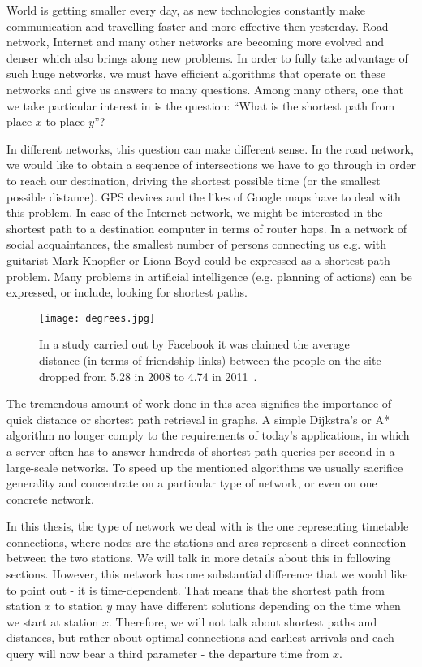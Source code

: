 \noindent World is getting smaller every day, as new technologies constantly make communication and travelling faster and more effective then yesterday. Road network, Internet and many other networks are becoming more evolved and denser which also brings along new problems. In order to fully take advantage of such huge networks, we must have efficient algorithms that operate on these networks and give us answers to many questions. Among many others, one that we take particular interest in is the question: ``What is the shortest path from place $x$ to place $y$''?

In different networks, this question can make different sense. In the road network, we would like to obtain a sequence of intersections we have to go through in order to reach our destination, driving the shortest possible time (or the smallest possible distance). GPS devices and the likes of Google maps have to deal with this problem. In case of the Internet network, we might be interested in the shortest path to a destination computer in terms of router hops. In a network of social acquaintances, the smallest number of persons connecting us e.g. with guitarist Mark Knopfler or Liona Boyd could be expressed as a shortest path problem. Many problems in artificial intelligence (e.g. planning of actions) can be expressed, or include, looking for shortest paths.

\begin{wrapfigure}{r}{6cm}
	\centering
	\texttt{[image: degrees.jpg]}
	\caption{\label{fig:degrees} In a study carried out by Facebook it was claimed the average distance (in terms of friendship links) between the people on the site dropped from 5.28 in 2008 to 4.74 in 2011~\cite{degrees}.}
\end{wrapfigure}

The tremendous amount of work done in this area signifies the importance of quick distance or shortest path retrieval in graphs. A simple Dijkstra's or A* algorithm no longer comply to the requirements of today's applications, in which a server often has to answer hundreds of shortest path queries per second in a large-scale networks. To speed up the mentioned algorithms we usually sacrifice generality and concentrate on a particular type of network, or even on one concrete network.

In this thesis, the type of network we deal with is the one representing timetable connections, where nodes are the stations and arcs represent a direct connection between the two stations. We will talk in more details about this in following sections. However, this network has one substantial difference that we would like to point out - it is time-dependent. That means that the shortest path from station $x$ to station $y$ may have different solutions depending on the time when we start at station $x$. Therefore, we will not talk about shortest paths and distances, but rather about optimal connections and earliest arrivals and each query will now bear a third parameter - the departure time from $x$. \\

